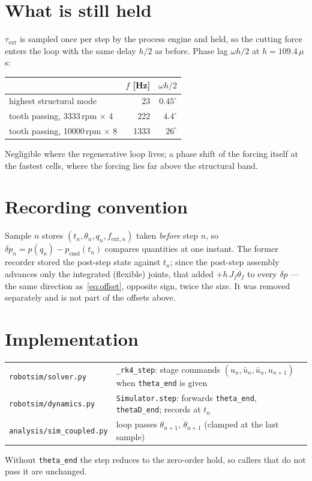 \documentclass[11pt]{article}
\begin{document}
\section{What is still held}

$\tau_{\mathrm{ext}}$ is sampled once per step by the process engine and held, so the cutting
force enters the loop with the same delay $h/2$ as before. Phase lag $\omega h/2$ at
$h=109.4\,\mu$s:
\begin{center}
\begin{tabular}{lrr}
\toprule
 & $f$ [Hz] & $\omega h/2$ \\
\midrule
highest structural mode & 23   & $0.45^\circ$ \\
tooth passing, 3333\,rpm $\times$ 4 & 222 & $4.4^\circ$ \\
tooth passing, 10000\,rpm $\times$ 8 & 1333 & $26^\circ$ \\
\bottomrule
\end{tabular}
\end{center}
Negligible where the regenerative loop lives; a phase shift of the forcing itself at the fastest
cells, where the forcing lies far above the structural band.

\section{Recording convention}

Sample $n$ stores $(t_n,\theta_n,q_n,f_{\mathrm{ext},n})$ taken \emph{before} step $n$, so
$\delta p_n=p(q_n)-p_{\mathrm{cmd}}(t_n)$ compares quantities at one instant. The former recorder
stored the post-step state against $t_n$; since the post-step assembly advances only the
integrated (flexible) joints, that added $+h\,J_f\dot\theta_f$ to every $\delta p$ --- the same
direction as~\eqref{eq:offset}, opposite sign, twice the size. It was removed separately and is
not part of the offsets above.

\section{Implementation}

\begin{center}
\begin{tabular}{lp{}}
\toprule
\texttt{robotsim/solver.py}   & \texttt{\_rk4\_step}: stage commands $(u_n,\bar u_n,\bar u_n,u_{n+1})$
                                 when \texttt{theta\_end} is given \\
\texttt{robotsim/dynamics.py} & \texttt{Simulator.step}: forwards \texttt{theta\_end},
                                 \texttt{thetaD\_end}; records at $t_n$ \\
\texttt{analysis/sim\_coupled.py} & loop passes $\theta_{n+1}$, $\dot\theta_{n+1}$
                                 (clamped at the last sample) \\
\bottomrule
\end{tabular}
\end{center}
Without \texttt{theta\_end} the step reduces to the zero-order hold, so callers that do not pass
it are unchanged.
\end{document}
